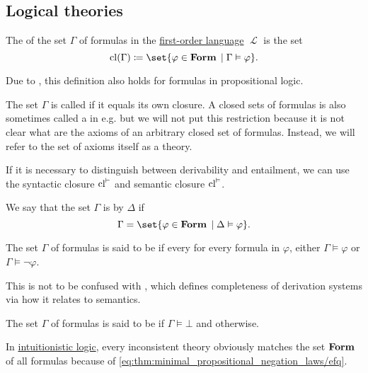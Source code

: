\subsection{Logical theories}\label{subsec:logical_theories}

\begin{definition}\label{def:first_order_theory}
  The  of the set \( \Gamma \) of formulas in the \hyperref[def:first_order_syntax]{first-order language} \( \mscrL \) is the set
  \begin{equation*}
    \cl(\Gamma) \coloneqq \set{ \varphi \in \boldop{Form} \given \Gamma \vDash \varphi }.
  \end{equation*}

  Due to , this definition also holds for formulas in propositional logic.

  The set \( \Gamma \) is called  if it equals its own closure. A closed sets of formulas is also sometimes called a  in e.g. \cite[def. 33.1]{OpenLogicFull} but we will not put this restriction because it is not clear what are the axioms of an arbitrary closed set of formulas. Instead, we will refer to the set of axioms itself as a theory.

  If it is necessary to distinguish between derivability and entailment, we can use the syntactic closure \( \operatorname{cl}^\vdash \) and semantic closure \( \operatorname{cl}^\vDash \).

  \begin{thmenum}
     We say that the set \( \Gamma \) is  by \( \Delta \) if
    \begin{equation*}
      \Gamma = \set{ \varphi \in \boldop{Form} \given \Delta \vDash \varphi }.
    \end{equation*}

     The set \( \Gamma \) of formulas is said to be  if every for every formula in \( \varphi \), either \( \Gamma \vDash \varphi \) or \( \Gamma \vDash \neg \varphi \).

    This is not to be confused with , which defines completeness of derivation systems via how it relates to semantics.

     The set \( \Gamma \) of formulas is said to be  if \( \Gamma \vDash \bot \) and  otherwise.

    In \hyperref[def:intuitionistic_logic]{intuitionistic logic}, every inconsistent theory obviously matches the set \( \operatorname{\mathbf{Form}} \) of all formulas because of \eqref{eq:thm:minimal_propositional_negation_laws/efq}.
  \end{thmenum}
\end{definition}

